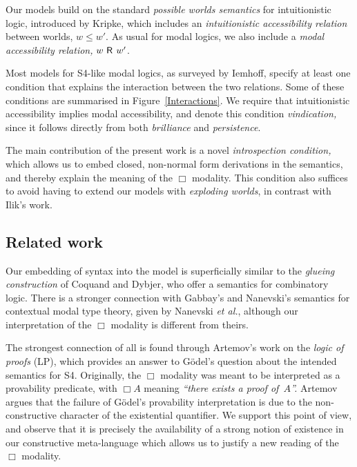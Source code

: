 \documentclass[submission,copyright,creativecommons,sharealike,backref=page]{eptcs}
\newcommand{\R}{\mathrel{\rlap{$\mkern.75mu\textsf{R}$}\hphantom{\subseteq}}}
\renewcommand{\:}{\mathop{\mkern3mu:\mkern3mu}}
\renewcommand{\.}{\mathop{\mkern3mu.\mkern3mu}}
\renewcommand{\;}{\mathop{;}}
\renewcommand{\,}{\mathop{,}}
\theoremstyle{mystyle}
\begin{document}
Our models build on the standard \emph{possible worlds semantics} for intuitionistic logic, introduced by Kripke\cite{Kripke65}, which includes an \emph{intuitionistic accessibility relation} between worlds, $w \le w'$.  As usual for modal logics, we also include a \emph{modal accessibility relation,} $w \R w'$.

Most models for S4-like modal logics, as surveyed by Iemhoff\cite{Iemhoff01}, specify at least one condition that explains the interaction between the two relations.  Some of these conditions are summarised in Figure~\ref{Interactions}.  We require that intuitionistic accessibility implies modal accessibility, and denote this condition \emph{vindication,} since it follows directly from both \emph{brilliance} and \emph{persistence}.

The main contribution of the present work is a novel \emph{introspection condition,} which allows us to embed closed, non-normal form derivations in the semantics, and thereby explain the meaning of the $\Box$ modality.  This condition also suffices to avoid having to extend our models with \emph{exploding worlds}, in contrast with Ilik's work.


\subsection*{Related work}

Our embedding of syntax into the model is superficially similar to the \emph{glueing construction} of Coquand and Dybjer\cite{CoquandD97}, who offer a semantics for combinatory logic.  There is a stronger connection with Gabbay's and Nanevski's\cite{GabbayN13} semantics for contextual modal type theory, given by Nanevski \emph{et al.}\cite{NanevskiPP08}, although our interpretation of the $\Box$ modality is different from theirs.

The strongest connection of all is found through Artemov's\cite{Artemov01} work on the \emph{logic of proofs} (LP), which provides an answer to G{\"o}del's\cite{Godel33} question about the intended semantics for S4.  Originally, the $\Box$ modality was meant to be interpreted as a provability predicate, with $\Box A$ meaning \textsl{``there exists a proof of~$A$''.}  Artemov argues that the failure of G{\"o}del's provability interpretation is due to the non-constructive character of the existential quantifier.  We support this point of view, and observe that it is precisely the availability of a strong notion of existence in our constructive meta-language which allows us to justify a new reading of the $\Box$ modality.
\end{document}

